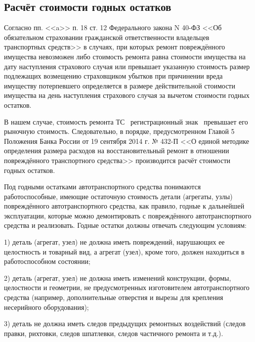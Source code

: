 \subsection{Расчёт стоимости годных остатков}



\par \indent  Согласно пп. <<a>> п. 18 ст. 12 Федерального закона  N 40-ФЗ  <<Об обязательном страховании гражданской ответственности владельцев транспортных средств>>  в случаях, при которых ремонт повреждённого имущества невозможен либо стоимость ремонта равна стоимости имущества на дату наступления страхового случая или превышает указанную стоимость размер подлежащих возмещению страховщиком убытков при причинении вреда имуществу потерпевшего определяется в размере действительной стоимости имущества на день наступления страхового случая за вычетом стоимости годных остатков. 

В нашем случае,  стоимость ремонта ТС \, регистрационный знак \, превышает его рыночную стоимость. Следовательно, в порядке, предусмотренном  Главой 5 Положения Банка России от 19 сентября 2014 г. № 432-П <<О единой методике определения размера расходов на восстановительный ремонт в отношении повреждённого транспортного средства>>  производится расчёт стоимости годных остатков. 

\par Под годными остатками автотранспортного средства понимаются работоспособные, имеющие остаточную стоимость детали (агрегаты, узлы) повреждённого автотранспортного средства, как правило, годные к дальнейшей эксплуатации, которые можно демонтировать с повреждённого автотранспортного средства и реализовать. 
Годные остатки должны отвечать следующим условиям:

1) деталь (агрегат, узел) не должна иметь повреждений, нарушающих ее целостность и товарный вид, а агрегат (узел), кроме того, должен находиться в работоспособном состоянии;

2) деталь (агрегат, узел) не должна иметь изменений конструкции, формы, целостности и геометрии, не предусмотренных изготовителем автотранспортного средства (например, дополнительные отверстия и вырезы для крепления несерийного оборудования);

3) деталь не должна иметь следов предыдущих ремонтных воздействий (следов правки, рихтовки, следов шпатлевки, следов частичного ремонта и т.д.).



